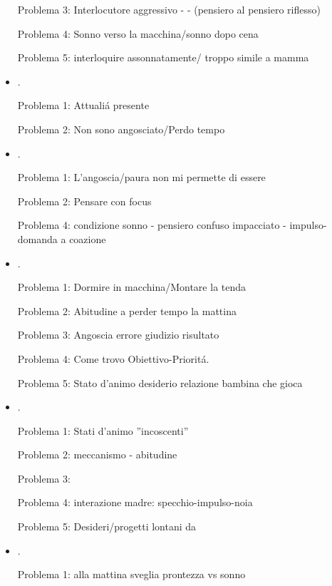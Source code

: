 \begin{itemize}
Problema 3: Interlocutore aggressivo -  -  (pensiero al pensiero riflesso)

Problema 4: Sonno verso la macchina/sonno dopo cena

Problema 5: interloquire assonnatamente/ troppo simile a mamma

\item {}.

Problema 1: Attuali\'a presente

Problema 2: Non sono angosciato/Perdo tempo

\item {}.

Problema 1: L'angoscia/paura non mi permette di essere

Problema 2: Pensare con focus 

Problema 4: condizione sonno - pensiero confuso impacciato - impulso-domanda a coazione

\item {}.

Problema 1: Dormire in macchina/Montare la tenda

Problema 2: Abitudine a perder tempo la mattina

Problema 3: Angoscia errore giudizio risultato

Problema 4: Come trovo Obiettivo-Priorit\'a.

Problema 5: Stato d'animo desiderio relazione bambina che gioca

\item {}.

Problema 1: Stati d'animo ''incoscenti''

Problema 2: meccanismo - abitudine

Problema 3: 

Problema 4: interazione madre: specchio-impulso-noia

Problema 5: Desideri/progetti lontani da 

\item {}.

Problema 1: alla mattina sveglia prontezza vs sonno


\end{itemize}
